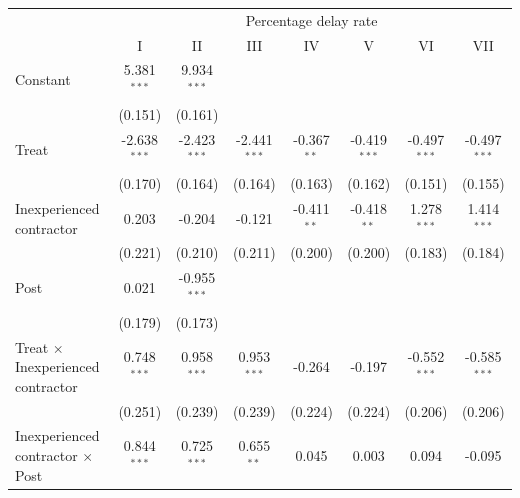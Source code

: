 \documentclass[
]{article}
\begin{document}
\begin{tabular}{lccccccc}
   \toprule
    & \multicolumn{7}{c}{Percentage delay rate}\\
                                                           & I              & II             & III            & IV            & V              & VI             & VII\\  
   Constant                                                & 5.381$^{***}$  & 9.934$^{***}$  &                &               &                &                &   \\   
                                                           & (0.151)        & (0.161)        &                &               &                &                &   \\   
   Treat                                                   & -2.638$^{***}$ & -2.423$^{***}$ & -2.441$^{***}$ & -0.367$^{**}$ & -0.419$^{***}$ & -0.497$^{***}$ & -0.497$^{***}$\\   
                                                           & (0.170)        & (0.164)        & (0.164)        & (0.163)       & (0.162)        & (0.151)        & (0.155)\\   
   Inexperienced contractor                                & 0.203          & -0.204         & -0.121         & -0.411$^{**}$ & -0.418$^{**}$  & 1.278$^{***}$  & 1.414$^{***}$\\   
                                                           & (0.221)        & (0.210)        & (0.211)        & (0.200)       & (0.200)        & (0.183)        & (0.184)\\   
   Post                                                    & 0.021          & -0.955$^{***}$ &                &               &                &                &   \\   
                                                           & (0.179)        & (0.173)        &                &               &                &                &   \\   
   Treat $\times$ Inexperienced contractor                 & 0.748$^{***}$  & 0.958$^{***}$  & 0.953$^{***}$  & -0.264        & -0.197         & -0.552$^{***}$ & -0.585$^{***}$\\   
                                                           & (0.251)        & (0.239)        & (0.239)        & (0.224)       & (0.224)        & (0.206)        & (0.206)\\   
   Inexperienced contractor $\times$ Post                  & 0.844$^{***}$  & 0.725$^{***}$  & 0.655$^{**}$   & 0.045         & 0.003          & 0.094          & -0.095\\   

\end{tabular}
\end{document}
